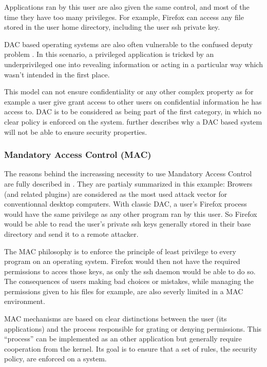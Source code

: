 \documentclass[pdftex,a4paper,titlepage,11pt]{article}
\begin{document}
\bigskip

Applications ran by this user are also given the same control, and most of the
time they have too many privileges. For example, Firefox can access any file
stored in the user home directory, including the user ssh private key.

\bigskip

DAC based operating systems are also often vulnerable to the confused deputy
problem \cite{confuseddeputyproblem}. In this scenario, a privileged
application is tricked by an underprivileged one into revealing information or
acting in a particular way which wasn't intended in the first place.

\bigskip

This model can not ensure confidentiality or any other complex property as for
example a user give grant access to other users on confidential information he
has access to. DAC is to be considered as being part of the first category, in
which no clear policy is enforced on the system. \cite{hru1976protection}
further describes why a DAC based system will not be able to ensure security
properties.

\subsubsection{Mandatory Access Control (MAC)}

The reasons behind the increassing necessity to use Mandatory Access Control
are fully described in \cite{inevitabilityoffailure1998}. They are partialy
summarized in this example: Browers (and related plugins) are considered as the
most used attack vector for conventionnal desktop computers. With classic DAC,
a user's Firefox process would have the same privilege as any other program ran
by this user. So Firefox would be able to read the user's private ssh keys
generally stored in their base directory and send it to a remote attacker.

\bigskip

The MAC philosophy is to enforce the principle of least privilege to every
program on an operating system. Firefox would then not have the required
permissions to acces those keys, as only the ssh daemon would be able to do so.
The consequences of users making bad choices or mistakes, while managing the
permissions given to his files for example, are also severly limited in a MAC
environment.

\bigskip

MAC mechanisms are based on clear distinctions between the user (its
applications) and the process responsible for grating or denying permissions.
This ``process'' can be implemented as an other application but generally
require cooperation from the kernel. Its goal is to ensure that a set of rules,
the security policy, are enforced on a system.
\end{document}
